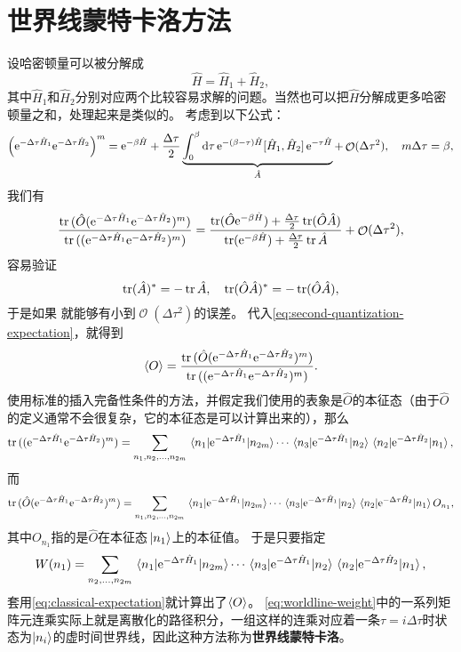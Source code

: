 \documentclass[hyperref, UTF8, a4paper]{ctexart}
\newcommand*{\ee}{\mathrm{e}}
\DeclareMathOperator{\bigO}{\mathcal{O}}
\begin{document}
\section{世界线蒙特卡洛方法}

设哈密顿量可以被分解成
\begin{equation}
    \hat{H} = \hat{H}_1 + \hat{H}_2,
\end{equation}
其中$\hat{H}_1$和$\hat{H}_2$分别对应两个比较容易求解的问题。当然也可以把$\hat{H}$分解成更多哈密顿量之和，处理起来是类似的。
考虑到以下公式：
\begin{equation}
    \left( \ee^{-\Delta \tau \hat{H}_1} \ee^{- \Delta \tau \hat{H}_2} \right)^m = \ee^{-\beta \hat{H}} + \frac{\Delta \tau}{2} \underbrace{\int_0^\beta \dd{\tau} \ee^{-(\beta-\tau) \hat{H}} \comm*{\hat{H}_1}{\hat{H}_2} \ee^{-\tau \hat{H}}}_{\hat{A}} + \bigO(\Delta \tau^2), \quad m \Delta \tau = \beta,
\end{equation}
我们有
\[
    \frac{\trace{(\hat{O} ( \ee^{-\Delta \tau \hat{H}_1} \ee^{- \Delta \tau \hat{H}_2} )^m)}}{\trace{(( \ee^{-\Delta \tau \hat{H}_1} \ee^{- \Delta \tau \hat{H}_2} )^m)}} = \frac{\trace(\hat{O} \ee^{-\beta \hat{H}}) + \frac{\Delta \tau}{2} \trace(\hat{O} \hat{A})}{\trace(\ee^{-\beta \hat{H}}) + \frac{\Delta \tau}{2} \trace\hat{A}} + \bigO(\Delta \tau^2),
\]
容易验证
\[
    \trace(\hat{A})^* = - \trace \hat{A}, \quad \trace(\hat{O} \hat{A})^* = - \trace(\hat{O} \hat{A}),
\]
于是如果
就能够有小到$\bigO(\Delta \tau^2)$的误差。
代入\eqref{eq:second-quantization-expectation}，就得到
\[
    \expval{O} = \frac{\trace{(\hat{O} ( \ee^{-\Delta \tau \hat{H}_1} \ee^{- \Delta \tau \hat{H}_2} )^m)}}{\trace{(( \ee^{-\Delta \tau \hat{H}_1} \ee^{- \Delta \tau \hat{H}_2} )^m)}}.
\]
使用标准的插入完备性条件的方法，并假定我们使用的表象是$\hat{O}$的本征态（由于$\hat{O}$的定义通常不会很复杂，它的本征态是可以计算出来的），那么
\[
    \trace{(( \ee^{-\Delta \tau \hat{H}_1} \ee^{- \Delta \tau \hat{H}_2} )^m)} = \sum_{n_1, n_2, \ldots, n_{2m}} \mel{n_1}{\ee^{-\Delta \tau \hat{H}_1}}{n_{2m}} \cdots \mel{n_3}{\ee^{-\Delta \tau \hat{H}_1}}{n_2} \mel{n_2}{\ee^{-\Delta \tau \hat{H}_2}}{n_1},
\]
而
\[
    \trace{(\hat{O} ( \ee^{-\Delta \tau \hat{H}_1} \ee^{- \Delta \tau \hat{H}_2} )^m)} = \sum_{n_1, n_2, \ldots, n_{2m}} \mel{n_1}{\ee^{-\Delta \tau \hat{H}_1}}{n_{2m}} \cdots \mel{n_3}{\ee^{-\Delta \tau \hat{H}_1}}{n_2} \mel{n_2}{\ee^{-\Delta \tau \hat{H}_2}}{n_1} O_{n_1},
\]
其中$O_{n_1}$指的是$\hat{O}$在本征态$\ket*{n_1}$上的本征值。
于是只要指定
\begin{equation}
    W(n_1) = \sum_{n_2, \ldots, n_{2m}} \mel{n_1}{\ee^{-\Delta \tau \hat{H}_1}}{n_{2m}} \cdots \mel{n_3}{\ee^{-\Delta \tau \hat{H}_1}}{n_2} \mel{n_2}{\ee^{-\Delta \tau \hat{H}_2}}{n_1},
    \label{eq:worldline-weight}
\end{equation}
套用\eqref{eq:classical-expectation}就计算出了$\expval{O}$。
\eqref{eq:worldline-weight}中的一系列矩阵元连乘实际上就是离散化的路径积分，一组这样的连乘对应着一条$\tau=i \Delta \tau$时状态为$\ket{n_i}$的虚时间世界线，因此这种方法称为\textbf{世界线蒙特卡洛}。
\end{document}
